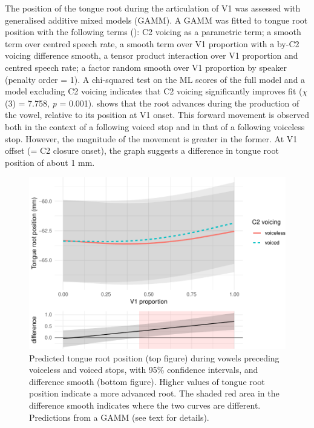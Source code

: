 \documentclass[12pt,]{article}
\begin{document}
\label{s:trp-v1}

The position of the tongue root during the articulation of V1 was
assessed with generalised additive mixed models (GAMM). A GAMM was
fitted to tongue root position with the following terms
(): C2 voicing as a parametric term; a smooth
term over centred speech rate, a smooth term over V1 proportion with a
by-C2 voicing difference smooth, a tensor product interaction over V1
proportion and centred speech rate; a factor random smooth over V1
proportion by speaker (penalty order = 1). A chi-squared test on the ML
scores of the full model and a model excluding C2 voicing indicates that
C2 voicing significantly improves fit (\(\chi\)(3) = 7.758, \emph{p} =
0.001).  shows that the root advances during the
production of the vowel, relative to its position at V1 onset. This
forward movement is observed both in the context of a following voiced
stop and in that of a following voiceless stop. However, the magnitude
of the movement is greater in the former. At V1 offset (= C2 closure
onset), the graph suggests a difference in tongue root position of about
1 mm.

\begin{figure}
\includegraphics[width=\linewidth]{2018-tra_files/figure-latex/tra-gam-plot-1} \caption{Predicted tongue root position (top figure) during vowels preceding voiceless and voiced stops, with 95\% confidence intervals, and difference smooth (bottom figure). Higher values of tongue root position indicate a more advanced root. The shaded red area in the difference smooth indicates where the two curves are different. Predictions from a GAMM (see text for details).}\label{f:tra-gam-plot}
\end{figure}
\end{document}
